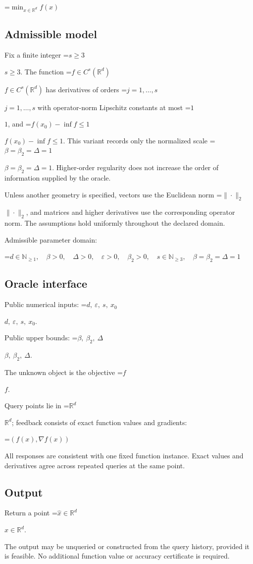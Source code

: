 \documentclass[10pt,a4paper]{article}
\newcommand{\AtlasMath}[1]{\par\begingroup\centering\setbox0=\hbox{$\displaystyle #1$}\ifdim\wd0>1.4\linewidth\typeout{ATLAS WIDE FORMULA: \the\wd0}\fi\ifdim\wd0>\linewidth\resizebox{\linewidth}{!}{\box0}\else\box0\fi\par\endgroup}
\newcommand{\AtlasInlineMath}[1]{\begingroup\setbox0=\hbox{$#1$}\ifdim\wd0>.4\linewidth\endgroup\AtlasMath{#1}\else\endgroup$#1$\fi}
\begin{document}
\AtlasMath{\min_{x\in \mathbb{R}^d}f(x)}


\subsection{Admissible model}
Fix a finite integer \AtlasInlineMath{s\ge3}. The function \AtlasInlineMath{f\in C^s(\mathbb R^d)} has derivatives of orders \AtlasInlineMath{j=1,\ldots,s} with operator-norm Lipschitz constants at most \AtlasInlineMath{1}, and \AtlasInlineMath{f(x_0)-\inf f\le1}. This variant records only the normalized scale \AtlasInlineMath{\beta=\beta_2=\Delta=1}. Higher-order regularity does not increase the order of information supplied by the oracle.

Unless another geometry is specified, vectors use the Euclidean norm \AtlasInlineMath{\|\cdot\|_2}, and matrices and higher derivatives use the corresponding operator norm. The assumptions hold uniformly throughout the declared domain.

Admissible parameter domain:


\AtlasMath{d\in\mathbb{N}_{\ge1},\quad \beta>0,\quad \Delta>0,\quad \varepsilon>0,\quad \beta_2>0,\quad s\in\mathbb{N}_{\ge3},\quad \beta=\beta_2=\Delta=1}


\subsection{Oracle interface}
Public numerical inputs: \AtlasInlineMath{d,\ \varepsilon,\ s,\ x_0}.

Public upper bounds: \AtlasInlineMath{\beta,\ \beta_2,\ \Delta}.

The unknown object is the objective \AtlasInlineMath{f}.

Query points lie in \AtlasInlineMath{\mathbb{R}^d}; feedback consists of exact function values and gradients:


\AtlasMath{(f(x),\nabla f(x))}


All responses are consistent with one fixed function instance. Exact values and derivatives agree across repeated queries at the same point.

\subsection{Output}
Return a point \AtlasInlineMath{\widehat x\in\mathbb R^d}.

The output may be unqueried or constructed from the query history, provided it is feasible. No additional function value or accuracy certificate is required.
\end{document}
